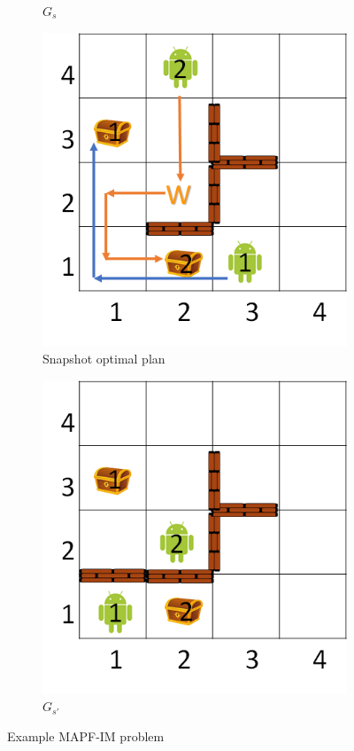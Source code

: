 \documentclass[letterpaper]{article} %
\def\
UrlFont{\rm}  %
\theoremstyle{definition}
\begin{document}
\begin{figure}[t]
\begin{subfigure}[b]{0.45\columnwidth}
      \caption{$G_s$}
      \label{fig:Gs0}
    \end{subfigure}
    \begin{subfigure}[b]{0.45\columnwidth}\centering  
      \includegraphics[scale=.3]{Figures/Gs0Plan.png}
      \caption{Snapshot optimal plan}
      \label{fig:PlanGs0}
    \end{subfigure}
    \begin{subfigure}[b]{0.45\columnwidth}\centering  
      \includegraphics[scale=.3]{Figures/Gs1.png}
      \caption{$G_{s'}$}
      \label{fig:Gs1}
    \end{subfigure}
    
    \caption{Example MAPF-IM problem}
    \label{fig:ProbelmDefinition}
\end{figure}
\end{document}
